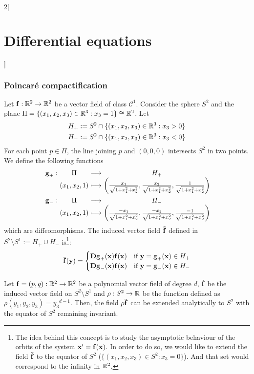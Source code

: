 \documentclass[../../../main.tex]{subfiles}
\begin{document}
\begin{multicols}{2}[\section{Differential equations}]
  \subsubsection{Poincaré compactification}
  \begin{definition}
    Let $\boldsymbol{\mathrm{f}}:\mathbb{R}^2\rightarrow\mathbb{R}^2$ be a vector field of class $\mathcal{C}^1$. Consider the sphere $S^2$ and the plane $\Pi=\{(x_1,x_2,x_3)\in\mathbb{R}^3:x_3=1\}\cong\mathbb{R}^2$. Let
    \begin{gather*}
      H_+:=S^2\cap\{(x_1,x_2,x_3)\in\mathbb{R}^3:x_3>0\}\\
      H_-:=S^2\cap\{(x_1,x_2,x_3)\in\mathbb{R}^3:x_3<0\}
    \end{gather*}
    For each point $p\in\Pi$, the line joining $p$ and $(0,0,0)$ intersects $S^2$ in two points. We define the following functions
    \begin{gather*}
      \function{\vf{g}_+}{\Pi}{H_+}{(x_1,x_2,1)}{\left(\frac{x_1}{\sqrt{1+x_1^2+x_2^2}},\frac{x_2}{\sqrt{1+x_1^2+x_2^2}},\frac{1}{\sqrt{1+x_1^2+x_2^2}}\right)}\\
      \function{\vf{g}_-}{\Pi}{H_-}{(x_1,x_2,1)}{\left(\frac{-x_1}{\sqrt{1+x_1^2+x_2^2}},\frac{-x_2}{\sqrt{1+x_1^2+x_2^2}},\frac{-1}{\sqrt{1+x_1^2+x_2^2}}\right)}
    \end{gather*}
    which are diffeomorphisms. The induced vector field $\boldsymbol{\mathrm{\tilde{f}}}$ defined in $S^2\setminus S^1:=H_+\cup H_-$ is\footnote{The idea behind this concept is to study the asymptotic behaviour of the orbits of the system $\boldsymbol{\mathrm{x}}'=\boldsymbol{\mathrm{f}}(\boldsymbol{\mathrm{x}})$. In order to do so, we would like to extend the field $\boldsymbol{\mathrm{\tilde{f}}}$ to the equator of $S^2$ ($\{(x_1,x_2,x_3)\in S^2:x_3=0\}$). And that set would correspond to the infinity in $\mathbb{R}^2$.}:
    $$\boldsymbol{\mathrm{\tilde{f}}}(\boldsymbol{\mathrm{y}})=
      \begin{cases}
        \boldsymbol{\mathrm{D}}\boldsymbol{\mathrm{g}}_+(\boldsymbol{\mathrm{x}}) \boldsymbol{\mathrm{f}}(\boldsymbol{\mathrm{x}}) & \text{if }\boldsymbol{\mathrm{y}}=\boldsymbol{\mathrm{g}}_+(\boldsymbol{\mathrm{x}})\in H_+ \\
        \boldsymbol{\mathrm{D}}\boldsymbol{\mathrm{g}}_-(\boldsymbol{\mathrm{x}}) \boldsymbol{\mathrm{f}}(\boldsymbol{\mathrm{x}}) & \text{if }\boldsymbol{\mathrm{y}}=\boldsymbol{\mathrm{g}}_-(\boldsymbol{\mathrm{x}})\in H_-
      \end{cases}
    $$
  \end{definition}
  \begin{proposition}
    Let $\boldsymbol{\mathrm{f}}=(p,q):\mathbb{R}^2\rightarrow\mathbb{R}^2$ be a polynomial vector field of degree $d$, $\boldsymbol{\mathrm{\tilde{f}}}$ be the induced vector field on $S^2\setminus S^1$ and $\rho:S^2\rightarrow\mathbb{R}$ be the function defined as $\rho(y_1,y_2,y_3)={y_3}^{d-1}$. Then, the field $\rho\boldsymbol{\mathrm{\tilde{f}}}$ can be extended analytically to $S^2$ with the equator of $S^2$ remaining invariant.

\end{proposition}
\end{multicols}
\end{document}

